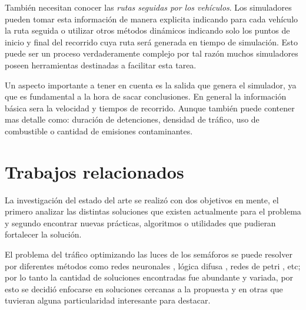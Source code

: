 También necesitan conocer las\emph{ rutas seguidas por los vehículos}. Los simuladores pueden tomar esta información de manera explicita indicando para cada vehículo la ruta seguida o utilizar otros métodos dinámicos indicando solo los puntos de inicio y final del recorrido cuya ruta será generada en tiempo de simulación. Esto puede ser un proceso verdaderamente complejo por tal razón muchos simuladores poseen herramientas destinadas a facilitar esta tarea.

Un aspecto importante a tener en cuenta es la salida que genera el simulador, ya que es fundamental a la hora de sacar conclusiones. En general la información básica sera la velocidad y tiempos de recorrido. Aunque también puede contener mas detalle como: duración de detenciones, densidad de tráfico, uso de combustible o cantidad de emisiones contaminantes.  
 


\section{Trabajos relacionados}

La investigación del estado del arte se realizó con dos objetivos en mente, el primero analizar las distintas soluciones que existen actualmente para el problema y segundo encontrar nuevas prácticas, algoritmos o utilidades que pudieran fortalecer la solución.

El problema del tráfico optimizando las luces de los semáforos se puede resolver por diferentes métodos como  redes neuronales \citep{Lopez1999}, lógica difusa \citep{Lim2001}, redes de petri \citep{DiFebbraro2002}, etc; por lo tanto la cantidad de soluciones encontradas fue abundante y variada, por esto se decidió enfocarse en soluciones cercanas a la propuesta y en otras que tuvieran alguna particularidad interesante para destacar.


